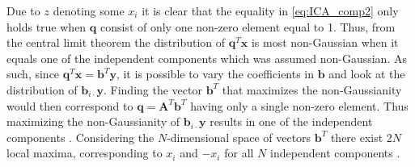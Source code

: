 Due to $z$ denoting some $x_i$ it is clear that the equality in \eqref{eq:ICA_comp2} only holds true when $\textbf{q}$ consist of only one non-zero element equal to 1.  
Thus, from the central limit theorem the distribution of $\textbf{q}^T\textbf{x}$ is most non-Gaussian when it equals one of the independent components which was assumed non-Gaussian. 
As such, since $\textbf{q}^T \textbf{x} = \textbf{b}^{T} \textbf{y}$, it is possible to vary the coefficients in $\textbf{b}$ and look at the distribution of $\textbf{b}_{i \cdot} \textbf{y}$. 
Finding the vector $\textbf{b}^T$ that maximizes the non-Gaussianity would then correspond to $\textbf{q} = \textbf{A}^T \textbf{b}^T$ having only a single non-zero element. 
Thus maximizing the non-Gaussianity of $\textbf{b}_{i \cdot} \textbf{y}$ results in one of the independent components \cite[p. 166]{ICA}. 
Considering the $N$-dimensional space of vectors $\textbf{b}^T$ there exist $2N$ local maxima, corresponding to $x_i$ and $-x_i$ for all $N$ independent components \cite[p. 166]{ICA}. 

